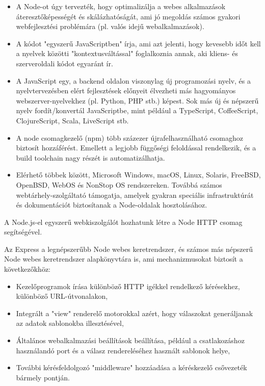 \begin{itemize}
\item A Node-ot úgy tervezték, hogy optimalizálja a webes alkalmazások áteresztőképességét és skálázhatóságát, ami jó megoldás számos gyakori webfejlesztési problémára (pl. valós idejű webalkalmazások).
\item A kódot "egyszerű JavaScriptben" írja, ami azt jelenti, hogy kevesebb időt kell a nyelvek közötti "kontextusváltással" foglalkoznia annak, aki kliens- és szerveroldali kódot egyaránt ír.
\item A JavaScript egy, a backend oldalon viszonylag új programozási nyelv, és a nyelvtervezésben elért fejlesztések előnyeit élvezheti más hagyományos webszerver-nyelvekhez (pl. Python, PHP stb.) képest. Sok más új és népszerű nyelv fordít/konvertál JavaScriptbe, mint például a TypeScript, CoffeeScript, ClojureScript, Scala, LiveScript stb.
\item  A node csomagkezelő (npm) több százezer újrafelhasználható csomaghoz biztosít hozzáférést. Emellett a legjobb függőségi feloldással rendelkezik, és a build toolchain nagy részét is automatizálhatja.
\item Elérhető többek között, Microsoft Windows, macOS, Linux, Solaris, FreeBSD, OpenBSD, WebOS és NonStop OS rendszereken. Továbbá számos webtárhely-szolgáltató támogatja, amelyek gyakran speciális infrastruktúrát és dokumentációt biztosítanak a Node-oldalak hosztolásához.
\end{itemize}

A Node.js-el egyszerű webkiszolgálót hozhatunk létre a Node HTTP csomag segítségével.\newline

Az Express a legnépszerűbb Node webes keretrendszer, és számos más népszerű Node webes keretrendszer alapkönyvtára is, ami mechanizmusokat biztosít a következőkhöz:

\begin{itemize}
\item Kezelőprogramok írása különböző HTTP igékkel rendelkező kérésekhez, különböző URL-útvonalakon,
\item Integrált a "view" renderelő motorokkal azért, hogy válaszokat generáljanak az adatok sablonokba illesztésével,
\item Általános webalkalmazási beállítások beállítása, például a csatlakozáshoz használandó port és a válasz rendereléséhez használt sablonok helye,
\item További kérésfeldolgozó "middleware" hozzáadása a kéréskezelő csővezeték bármely pontján.
\end{itemize}


